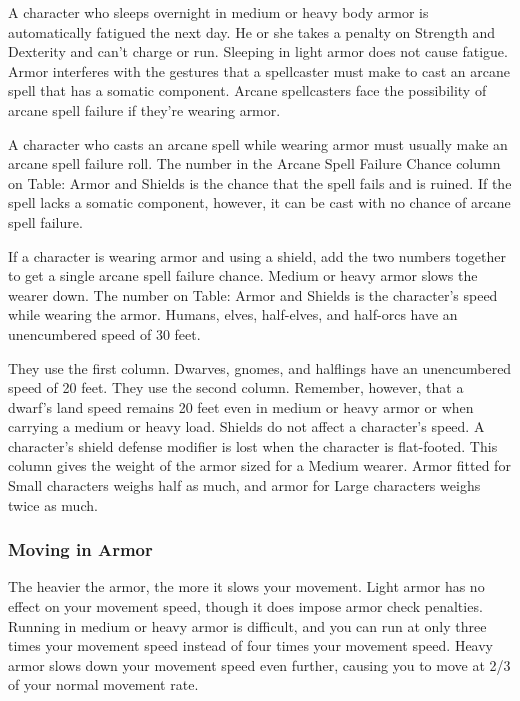  A character who sleeps overnight in medium or heavy body armor is automatically fatigued the next day. He or she takes a  penalty on Strength and Dexterity and can't charge or run. Sleeping in light armor does not cause fatigue.
 Armor interferes with the gestures that a spellcaster must make to cast an arcane spell that has a somatic component. Arcane spellcasters face the possibility of arcane spell failure if they're wearing armor.

 A character who casts an arcane spell while wearing armor must usually make an arcane spell failure roll. The number in the Arcane Spell Failure Chance column on Table: Armor and Shields is the chance that the spell fails and is ruined. If the spell lacks a somatic component, however, it can be cast with no chance of arcane spell failure.

 If a character is wearing armor and using a shield, add the two numbers together to get a single arcane spell failure chance.
 Medium or heavy armor slows the wearer down. The number on Table: Armor and Shields is the character's speed while wearing the armor. Humans, elves, half-elves, and half-orcs have an unencumbered speed of 30 feet.
\par They use the first column. Dwarves, gnomes, and halflings have an unencumbered speed of 20 feet. They use the second column. Remember, however, that a dwarf's land speed remains 20 feet even in medium or heavy armor or when carrying a medium or heavy load.
 Shields do not affect a character's speed.
 A character's shield defense modifier is lost when the character is flat-footed.
 This column gives the weight of the armor sized for a Medium wearer. Armor fitted for Small characters weighs half as much, and armor for Large characters weighs twice as much.

\subsubsection{Moving in Armor}
The heavier the armor, the more it slows your movement. Light armor has no effect on your movement speed, though it does impose armor check penalties. Running in medium or heavy armor is difficult, and you can run at only three times your movement speed instead of four times your movement speed. Heavy armor slows down your movement speed even further, causing you to move at 2/3 of your normal movement rate.

